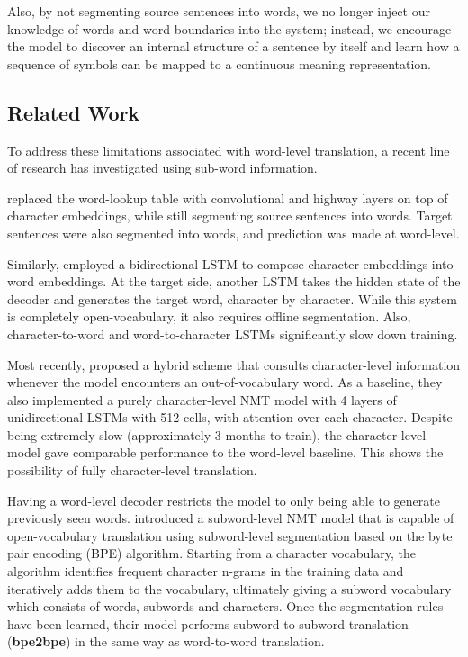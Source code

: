 \documentclass[11pt,letterpaper]{article}
\newcommand{\tb}{\textbf}
\begin{document}
    Also, by not segmenting source sentences into words, we no longer inject our knowledge of words and word boundaries into the system; instead, we encourage the model to discover an internal structure of a sentence by itself and learn how a sequence of symbols can be mapped to a continuous meaning representation.

    \subsection{Related Work}

    To address these limitations associated with word-level translation, a recent line of research has investigated using sub-word information.
    
     replaced the word-lookup table with convolutional and highway layers on top of character embeddings, while still segmenting source sentences into words. Target sentences were also segmented into words, and prediction was made at word-level.

    Similarly,  employed a bidirectional LSTM to compose character embeddings into word embeddings. At the target side, another LSTM takes the hidden state of the decoder and generates the target word, character by character. While this system is completely open-vocabulary, it also requires offline segmentation. Also, character-to-word and word-to-character LSTMs significantly slow down training.
    
    Most recently,  proposed a hybrid scheme that consults character-level information whenever the model encounters an out-of-vocabulary word. As a baseline, they also implemented a purely character-level NMT model with 4 layers of unidirectional LSTMs with 512 cells, with attention over each character. Despite being extremely slow (approximately 3 months to train), the character-level model gave comparable performance to the word-level baseline. This shows the possibility of fully character-level translation.

    Having a word-level decoder restricts the model to only being able to generate previously seen words.  introduced a subword-level NMT model that is capable of open-vocabulary translation using subword-level segmentation based on the byte pair encoding (BPE) algorithm. Starting from a character vocabulary, the algorithm identifies frequent character n-grams in the training data and iteratively adds them to the vocabulary, ultimately giving a subword vocabulary which consists of words, subwords and characters. Once the segmentation rules have been learned, their model performs subword-to-subword translation (\tb{bpe2bpe}) in the same way as word-to-word translation.
\end{document}
